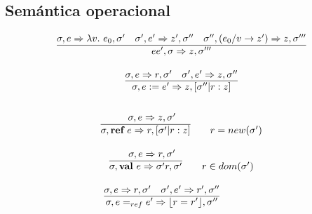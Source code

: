   \subsection{Semántica operacional} 
    \begin{multicols}{2}  
    \[\begin{array}{c}
      \underline{\sigma,e \Rightarrow \lambda v.\ e_0,\sigma'\quad \sigma',e' \Rightarrow z',\sigma''\quad \sigma'', (e_0/v\rightarrow z') \Rightarrow z,\sigma'''}\\
      ee',\sigma \Rightarrow z,\sigma''' \\ \\

      \underline{\sigma,e \Rightarrow r,\sigma'\quad \sigma',e' \Rightarrow z,\sigma''} \\
      \sigma,e:=e' \Rightarrow z,[\sigma''|r:z] \\ \\
    \end{array}\]
    \[\begin{array}{c}
      \sigma,e \Rightarrow z,\sigma' \qquad \qquad \qquad \\
      \overline{\sigma,\textbf{ref}\ e \Rightarrow r,[\sigma'|r:z]} \qquad r = new(\sigma') \\ \\

      \sigma,e \Rightarrow r,\sigma' \qquad \qquad \qquad \\
      \overline{\sigma,\textbf{val}\ e \Rightarrow \sigma' r,\sigma'} \qquad r \in dom(\sigma') \\ \\

      \underline{\sigma,e \Rightarrow r,\sigma'\quad \sigma',e' \Rightarrow r',\sigma''} \qquad \qquad \\
      \sigma,e=_{ref}e' \Rightarrow \lfloor r=r'\rfloor,\sigma'' \qquad \qquad 
    \end{array}\]
  \end{multicols}

